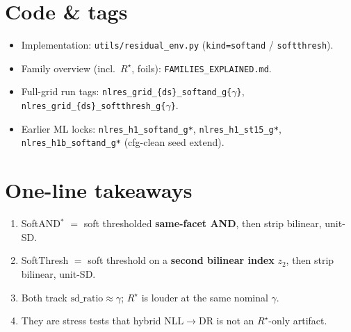 \documentclass[11pt,a4paper]{article}
\begin{document}
\section{Code \& tags}

\begin{itemize}[leftmargin=1.2em]
\item Implementation: \texttt{utils/residual\_env.py}
  (\texttt{kind=softand} / \texttt{softthresh}).
\item Family overview (incl.\ $R^\star$, foils): \texttt{FAMILIES\_EXPLAINED.md}.
\item Full-grid run tags: \texttt{nlres\_grid\_\{ds\}\_softand\_g\{$\gamma$\}},
  \texttt{nlres\_grid\_\{ds\}\_softthresh\_g\{$\gamma$\}}.
\item Earlier ML locks: \texttt{nlres\_h1\_softand\_g*}, \texttt{nlres\_h1\_st15\_g*},
  \texttt{nlres\_h1b\_softand\_g*} (cfg-clean seed extend).
\end{itemize}

\section{One-line takeaways}
\begin{enumerate}[leftmargin=1.4em]
\item SoftAND$^*$ $=$ soft thresholded \textbf{same-facet AND}, then strip bilinear, unit-SD.
\item SoftThresh $=$ soft threshold on a \textbf{second bilinear index} $z_2$, then strip bilinear, unit-SD.
\item Both track $\mathrm{sd\_ratio}\approx\gamma$; $R^\star$ is louder at the same nominal $\gamma$.
\item They are stress tests that hybrid NLL$\to$DR is not an $R^\star$-only artifact.
\end{enumerate}
\end{document}
